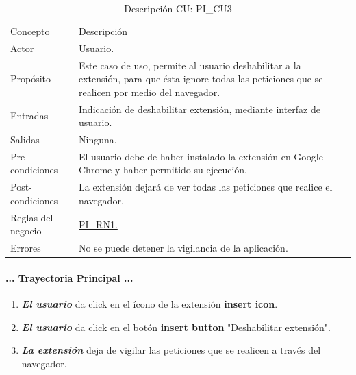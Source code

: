 \documentclass[12pt, a4paper, titlepage]{article}
\begin{document}
				\newpage
				\begin{table}[H]
				\begin{center}
				\begin{tabular}{ |p{3.5cm}||p{9.5cm}|}
					\hline
					\rowcolor{guindapoli}
					\multicolumn{2}{|c|}{\textbf{\textcolor{white}{Caso de uso: PI\_CU3. Deshabilitar extensión.}}}\\
					\hline
					\rowcolor{azulfuerte}Concepto & Descripción\\
					\hline
					\cellcolor{azulclaro}Actor & 
					Usuario.\\ 
					\hline
					\cellcolor{azulclaro}Propósito &
					Este caso de uso, permite al usuario deshabilitar a la extensión, para que ésta ignore todas las peticiones que se realicen por medio del navegador.\\
					\hline
					\cellcolor{azulclaro}Entradas &
					Indicación de deshabilitar extensión, mediante interfaz de usuario.\\
					\hline
					\cellcolor{azulclaro}Salidas &
					Ninguna.\\
					\hline
					\cellcolor{azulclaro}Pre-condiciones&
					El usuario debe de haber instalado la extensión en Google Chrome y haber permitido su ejecución.\\
					\hline
					\cellcolor{azulclaro}Post-condiciones&
					La extensión dejará de ver todas las peticiones que realice el navegador.\\
					\hline
					\cellcolor{azulclaro}Reglas del negocio&
					\hyperref[PI_RN1]{PI\_RN1.}\\
					\hline
					\cellcolor{azulclaro}Errores &
					No se puede detener la vigilancia de la aplicación.\\
					\hline
				\end{tabular}
				\caption[DCU: PI\_CU3]{Descripción CU: PI\_CU3}
				\end{center}
				\end{table}
			
				\paragraph{... Trayectoria Principal ...}
				\begin{enumerate}
					\item \textbf{\textit{El usuario}} da click en el ícono de la extensión \textbf{insert icon}.
					\item \textbf{\textit{El usuario}} da click en el botón \textbf{insert button} "Deshabilitar extensión".
					\item \textbf{\textit{La extensión}} deja de vigilar las peticiones que se realicen a través del navegador.
				\end{enumerate}
\end{document}
